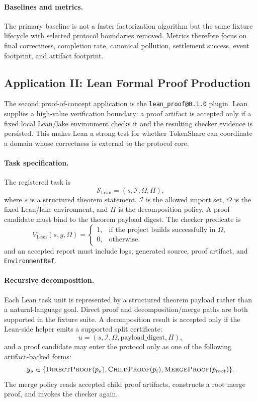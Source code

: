 \documentclass{article}
\theoremstyle{plain}
\begin{document}
{\paragraph{Baselines and metrics.}
{\color{blue}
The primary baseline is not a faster factorization algorithm but the same fixture lifecycle with selected protocol boundaries removed. Metrics therefore focus on final correctness, completion rate, canonical pollution, settlement success, event footprint, and artifact footprint.
}


\subsection{Application II: Lean Formal Proof Production}

{\color{blue}
The second proof-of-concept application is the \texttt{lean\_proof@0.1.0} plugin. Lean supplies a high-value verification boundary: a proof artifact is accepted only if a fixed local Lean/lake environment checks it and the resulting checker evidence is persisted. This makes Lean a strong test for whether TokenShare can coordinate a domain whose correctness is external to the protocol core.
}

\paragraph{Task specification.}
{\color{blue}
The registered task is
\[
\mathcal{S}_{\mathrm{Lean}}=(s,\mathcal{I},\Omega,\Pi),
\]
where $s$ is a structured theorem statement, $\mathcal{I}$ is the allowed import set, $\Omega$ is the fixed Lean/lake environment, and $\Pi$ is the decomposition policy. A proof candidate must bind to the theorem payload digest. The checker predicate is
\[
V_{\mathrm{Lean}}(s,y,\Omega)=
\begin{cases}
1, & \text{if the project builds successfully in } \Omega,\\
0, & \text{otherwise}.
\end{cases}
\]
and an accepted report must include logs, generated source, proof artifact, and \texttt{EnvironmentRef}.
}

\paragraph{Recursive decomposition.}
{\color{blue}
Each Lean task unit is represented by a structured theorem payload rather than a natural-language goal. Direct proof and decomposition/merge paths are both supported in the fixture suite. A decomposition result is accepted only if the Lean-side helper emits a supported split certificate:
\[
u=(s,\mathcal{I},\Omega,\mathrm{payload\_digest},\Pi),
\]
and a proof candidate may enter the protocol only as one of the following artifact-backed forms:
\[
y_u \in \{\textsc{DirectProof}(p_u),\textsc{ChildProof}(p_i),\textsc{MergeProof}(p_{\mathrm{root}})\}.
\]
The merge policy reads accepted child proof artifacts, constructs a root merge proof, and invokes the checker again.
}

}
\end{document}
